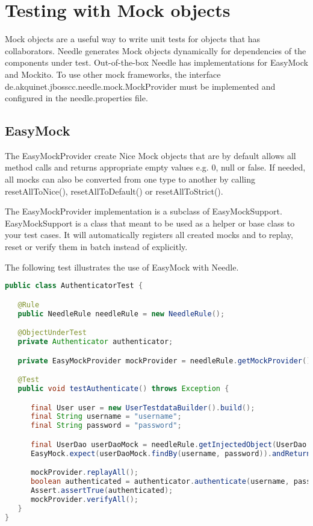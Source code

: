 \chapter{Testing with Mock objects}
Mock objects are a useful way to write unit tests for objects that has collaborators. Needle generates Mock objects dynamically for dependencies of the components under test. 
Out-of-the-box Needle has implementations for EasyMock and Mockito.
To use other mock frameworks, the interface de.akquinet.jbosscc.needle.mock.MockProvider must be implemented and configured in the needle.properties file.


\section{EasyMock}

The EasyMockProvider create Nice Mock objects that are by default allows all method calls and returns appropriate empty values e.g. 0, null or false. 
If needed, all mocks can also be converted from one type to another by calling resetAllToNice(), resetAllToDefault() or resetAllToStrict(). 

The EasyMockProvider implementation is a subclass of EasyMockSupport. EasyMockSupport is a class that meant to be used as a helper or base class to your test cases. It will automatically registers all created mocks and to replay, reset or verify them in batch instead of explicitly. 

The following test illustrates the use of EasyMock with Needle. 

\begin{lstlisting}[language={JAVA},caption=Testing with EasyMock]
public class AuthenticatorTest {

   @Rule
   public NeedleRule needleRule = new NeedleRule();

   @ObjectUnderTest
   private Authenticator authenticator;

   private EasyMockProvider mockProvider = needleRule.getMockProvider();

   @Test
   public void testAuthenticate() throws Exception {

      final User user = new UserTestdataBuilder().build();
      final String username = "username";
      final String password = "password";

      final UserDao userDaoMock = needleRule.getInjectedObject(UserDao.class);
      EasyMock.expect(userDaoMock.findBy(username, password)).andReturn(user);

      mockProvider.replayAll();
      boolean authenticated = authenticator.authenticate(username, password);
      Assert.assertTrue(authenticated);
      mockProvider.verifyAll();
   }
}
\end{lstlisting}

